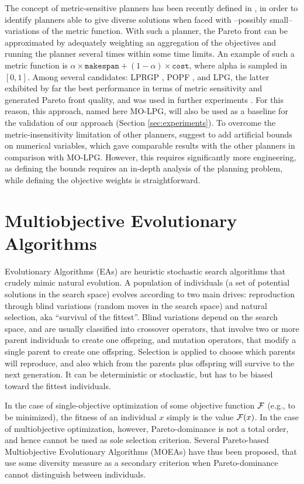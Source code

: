 \documentclass{article}
\newcommand{\MOLPG}{{\sc MO-LPG}}
\begin{document}
The concept of metric-sensitive planners has been recently defined in \cite{LPG-STAIRS2012}, in order to identify planners able to give diverse solutions when faced with --possibly small-- variations of the metric function. With such a planner, the Pareto front can be approximated by adequately weighting an aggregation of the objectives and running the planner several times within some time limits. An example of such a metric function is $\alpha\times\mathtt{makespan}+(1-\alpha)\times\mathtt{cost}$, where alpha is sampled in $[0,1]$.  Among several candidates: LPRGP \cite{LPRGP}, POPF \cite{POPF}, and LPG, the latter exhibited by far the best performance in terms of metric sensitivity and generated Pareto front quality, and was used in further experiments \cite{LPG-PlanSIG2012}. For this reason, this approach, named here \MOLPG, will also be used as a baseline for the validation of our approach (Section \ref{sec:experiments}). To overcome the metric-insensitivity 
limitation of other planners, \cite{LPG-STAIRS2012} suggest to add artificial bounds on numerical variables, which gave comparable results with the other 
planners in comparison with \MOLPG. However, this requires significantly more engineering, as defining the bounds requires an in-depth analysis of the planning problem, while defining the objective weights is straightforward.


\section{Multiobjective Evolutionary Algorithms}
\label{sec:pareto}

Evolutionary Algorithms (EAs) \cite{EibenSmith2003} are heuristic stochastic search algorithms that crudely mimic natural evolution. A population of individuals (a set of potential solutions in the search space) evolves according to two main drives: reproduction through blind variations (random moves in the search space) and natural selection, aka ``survival of the fittest''. Blind variations depend on the search space, and are usually classified into crossover operators, that involve two or more parent individuals to create one offspring, and mutation operators, that modify a single parent to create one offspring. Selection is applied to choose which parents will reproduce, and also which from the parents plus offspring will survive to the next generation. It can be deterministic or stochastic, but has to be biased toward the fittest individuals. 

In the case of single-objective optimization of some objective function $\cal F$ (e.g., to be minimized), the fitness of an individual $x$ simply is the value ${\cal F}(x)$. In the case of multiobjective optimization, however, Pareto-dominance is not a total order, and hence cannot be used as sole selection criterion. Several Pareto-based Multiobjective Evolutionary Algorithms (MOEAs) have thus been proposed, that use some diversity measure as a secondary criterion when Pareto-dominance cannot distinguish between individuals. 
\end{document}
